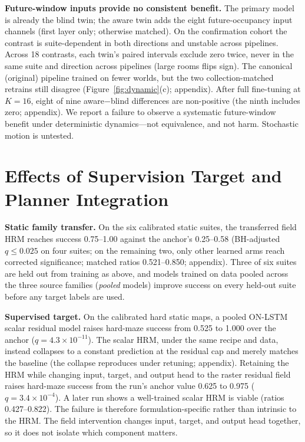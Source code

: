 \documentclass[letterpaper]{article} %
\begin{document}
\textbf{Future-window inputs provide no consistent benefit.} The primary model is already the blind twin; the aware twin adds the eight future-occupancy input channels (first layer only; otherwise matched). On the confirmation cohort the contrast is suite-dependent in both directions and unstable across pipelines. Across 18 contrasts, each twin's paired intervals exclude zero twice, never in the same suite and direction across pipelines (large rooms flips sign). The canonical (original) pipeline trained on fewer worlds, but the two collection-matched retrains still disagree (Figure~\ref{fig:dynamic}(c); appendix). After full fine-tuning at $K{=}16$, eight of nine aware$-$blind differences are non-positive (the ninth includes zero; appendix). We report a failure to observe a systematic future-window benefit under deterministic dynamics---not equivalence, and not harm. Stochastic motion is untested.

\section{Effects of Supervision Target and Planner Integration}

\textbf{Static family transfer.} On the six calibrated static suites, the transferred field HRM reaches success 0.75--1.00 against the anchor's 0.25--0.58 (BH-adjusted $q \leq 0.025$ on four suites; on the remaining two, only other learned arms reach corrected significance; matched ratios 0.521--0.850; appendix). Three of six suites are held out from training as above, and models trained on data pooled across the three source families (\emph{pooled} models) improve success on every held-out suite before any target labels are used.

\textbf{Supervised target.} On the calibrated hard static maps, a pooled ON-LSTM scalar residual model raises hard-maze success from 0.525 to 1.000 over the anchor ($q=4.3\times10^{-11}$). The scalar HRM, under the same recipe and data, instead collapses to a constant prediction at the residual cap and merely matches the baseline (the collapse reproduces under retuning; appendix). Retaining the HRM while changing input, target, and output head to the raster residual field raises hard-maze success from the run's anchor value 0.625 to 0.975 ($q=3.4\times10^{-4}$). A later run shows a well-trained scalar HRM is viable (ratios 0.427--0.822). The failure is therefore formulation-specific rather than intrinsic to the HRM. The field intervention changes input, target, and output head together, so it does not isolate which component matters.
\end{document}
